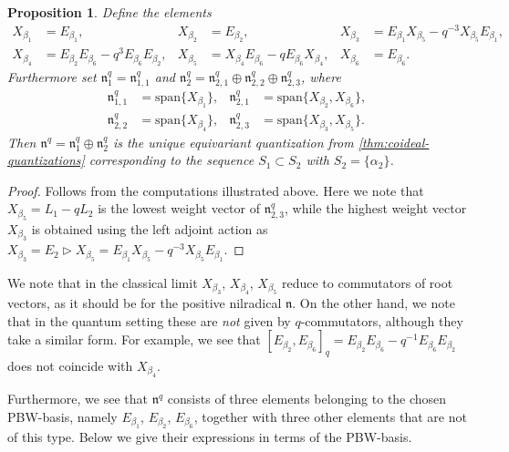 \documentclass[a4paper, 12pt, reqno, english]{amsart}
\numberwithin{equation}{section}
\numberwithin{figure}{section}
\theoremstyle{plain}
\theoremstyle{plain}
\theoremstyle{plain}
\newtheorem{proposition}[theorem]{Proposition}
\theoremstyle{plain}
\theoremstyle{plain}
\theoremstyle{definition}
\theoremstyle{definition}
\theoremstyle{definition}
\theoremstyle{remark}
\theoremstyle{definition}
\theoremstyle{definition}
\newcommand{\lien}{\mathfrak{n}}
\newcommand{\lspan}{\mathrm{span}}
\newcommand{\qnil}{\lien^q}
\begin{document}
\begin{proposition}
Define the elements
\begin{align*}
X_{\beta_1} & = E_{\beta_1}, &
X_{\beta_2} & = E_{\beta_2}, &
X_{\beta_3} & = E_{\beta_1} X_{\beta_5} - q^{-3} X_{\beta_5} E_{\beta_1}, \\
X_{\beta_4} & = E_{\beta_2} E_{\beta_6} - q^3 E_{\beta_6} E_{\beta_2}, &
X_{\beta_5} & = X_{\beta_4} E_{\beta_6} - q E_{\beta_6} X_{\beta_4}, &
X_{\beta_6} & = E_{\beta_6}.
\end{align*}
Furthermore set $\qnil_1 = \qnil_{1, 1}$ and $\qnil_2 = \qnil_{2, 1} \oplus \qnil_{2, 2} \oplus \qnil_{2, 3}$, where
\begin{align*}
\qnil_{1, 1} & = \lspan \{ X_{\beta_1} \}, &
\qnil_{2, 1} & = \lspan \{ X_{\beta_2}, X_{\beta_6} \}, \\
\qnil_{2, 2} & = \lspan \{ X_{\beta_4} \}, &
\qnil_{2, 3} & = \lspan \{ X_{\beta_3}, X_{\beta_5} \}.
\end{align*}
Then $\qnil = \qnil_1 \oplus \qnil_2$ is the unique equivariant quantization from \cref{thm:coideal-quantizations} corresponding to the sequence $S_1 \subset S_2$ with $S_2 = \{ \alpha_2 \}$.
\end{proposition}

\begin{proof}
Follows from the computations illustrated above.
Here we note that $X_{\beta_5} = L_1 - q L_2$ is the lowest weight vector of $\qnil_{2, 3}$, while the highest weight vector $X_{\beta_3}$ is obtained using the left adjoint action as $X_{\beta_3} = E_2 \triangleright X_{\beta_5} = E_{\beta_1} X_{\beta_5} - q^{-3} X_{\beta_5} E_{\beta_1}$.
\end{proof}

We note that in the classical limit $X_{\beta_3}$, $X_{\beta_4}$, $X_{\beta_5}$ reduce to commutators of root vectors, as it should be for the positive nilradical $\lien$.
On the other hand, we note that in the quantum setting these are \emph{not} given by $q$-commutators, although they take a similar form.
For example, we see that $[E_{\beta_2}, E_{\beta_6}]_q = E_{\beta_2} E_{\beta_6} - q^{-1} E_{\beta_6} E_{\beta_2}$ does not coincide with $X_{\beta_4}$.

Furthermore, we see that $\qnil$ consists of three elements belonging to the chosen PBW-basis, namely $E_{\beta_1}$, $E_{\beta_2}$, $E_{\beta_6}$, together with three other elements that are not of this type.
Below we give their expressions in terms of the PBW-basis.
\end{document}
